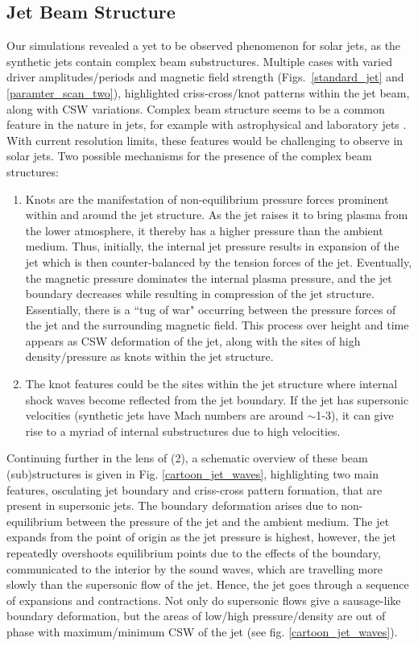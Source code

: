 \subsection{Jet Beam Structure}
\label{subsec:j_beam_struc}
Our simulations revealed a yet to be observed phenomenon for solar jets, as the synthetic jets contain complex beam substructures. Multiple cases with varied driver amplitudes/periods and magnetic field strength (Figs.~\ref{standard_jet} and \ref{paramter_scan_two}), highlighted criss-cross/knot patterns within the jet beam, along with CSW variations. Complex beam structure seems to be a common feature in the nature in jets, for example with astrophysical \citep{van_Putten_1996ApJ467L57V, DeGouveiaDalPino2005, Hada2013ApJ77570H, Cohen2014ApJ787151C, Hervet2017AnA606A103H} and laboratory jets \citep{Menon2010, Edgington-Mitchell2014, Ono2014}. With current resolution limits, these features would be challenging to observe in solar jets. Two possible mechanisms for the presence of the complex beam structures:
\begin{enumerate}
\item{Knots are the manifestation of non-equilibrium pressure forces prominent within and around the jet structure. As the jet raises it to bring plasma from the lower atmosphere, it thereby has a higher pressure than the ambient medium. Thus, initially, the internal jet pressure results in expansion of the jet which is then counter-balanced by the tension forces of the jet. Eventually, the magnetic pressure dominates the internal plasma pressure, and the jet boundary decreases while resulting in compression of the jet structure. Essentially, there is a ``tug of war" occurring between the pressure forces of the jet and the surrounding magnetic field. This process over height and time appears as CSW deformation of the jet, along with the sites of high density/pressure as knots within the jet structure.}
\item{The knot features could be the sites within the jet structure where internal shock waves \citep{Norman1982} become reflected from the jet boundary. If the jet has supersonic velocities  (synthetic jets have Mach numbers are around $\sim$1-3), it can give rise to a myriad of internal substructures due to high velocities.}
\end{enumerate}
Continuing further in the lens of (2), a schematic overview of these beam (sub)structures is given in Fig. \ref{cartoon_jet_waves}, highlighting two main features, osculating jet boundary and criss-cross pattern formation, that are present in supersonic jets. The boundary deformation arises due to non-equilibrium between the pressure of the jet and the ambient medium. The jet expands from the point of origin as the jet pressure is highest, however, the jet repeatedly overshoots equilibrium points due to the effects of the boundary, communicated to the interior by the sound waves, which are travelling more slowly than the supersonic flow of the jet. Hence, the jet goes through a sequence of expansions and contractions. Not only do supersonic flows give a sausage-like boundary deformation, but the areas of low/high pressure/density are out of phase with maximum/minimum CSW of the jet (see fig. \ref{cartoon_jet_waves}). \np 
